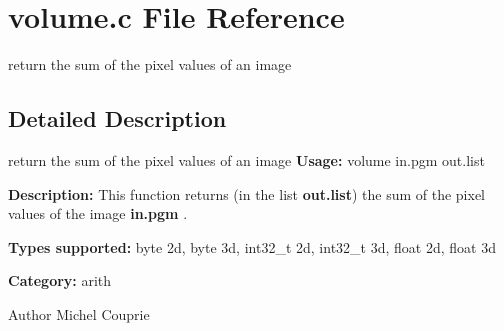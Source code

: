 \section{volume.c File Reference}
\label{volume_8c}


return the sum of the pixel values of an image  




\subsection{Detailed Description}
return the sum of the pixel values of an image {\bfseries Usage:} volume in.pgm out.list

{\bfseries Description:} This function returns (in the list {\bfseries out.list}) the sum of the pixel values of the image {\bfseries in.pgm} .

{\bfseries Types supported:} byte 2d, byte 3d, int32\_\-t 2d, int32\_\-t 3d, float 2d, float 3d

{\bfseries Category:} arith

\begin{DoxyAuthor}{Author}
Michel Couprie 
\end{DoxyAuthor}
